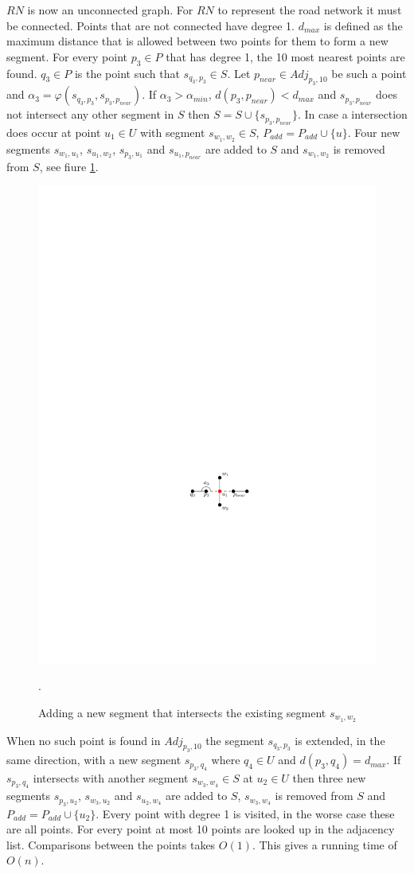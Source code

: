 \documentclass[11pt]{article}
\begin{document}
$RN$ is now an unconnected graph. For $RN$ to represent the road network it must be connected. Points that are not connected have degree 1. $d_{max}$ is defined as the maximum distance that is allowed between two points for them to form a new segment. For every point $p_3 \in P$ that has degree 1, the 10 most nearest points are found. $q_3 \in P$ is the point such that $s_{q_3, p_3} \in S$. Let $p_{near} \in Adj_{p_3,10}$ be such a point and $\alpha_3=\varphi(s_{q_3, p_3},s_{p_3, p_{near}})$. If $\alpha_3>\alpha_{min}$, $d(p_3,p_{near})<d_{max}$ and $s_{p_3, p_{near}}$ does not intersect any other segment in $S$ then $S=S \cup \{s_{p_3, p_{near}}\}$. In case a intersection does occur at point $u_1 \in U$ with segment $s_{w_1, w_2}\in S$, $P_{add}=P_{add}\cup \{u\}$. Four new segments $s_{w_1, u_1}$, $s_{u_1, w_2}$, $s_{p_3, u_1}$ and $s_{u_1, p_{near}}$ are added to $S$ and $s_{w_1, w_2}$ is removed from $S$, see fiure \ref{addintersect}.

\begin{figure}[h]
\centering
      \graphicspath{ {images/}}
      \includegraphics[width=0.5\linewidth]{NetworkAddIntersection}
      \caption{Adding a new segment that intersects the existing segment $s_{w_1,w_2}$}.
      \label{addintersect}
  \end{figure}

When no such point is found in $Adj_{p_3,10}$ the segment $s_{q_3, p_3}$ is extended, in the same direction, with a new segment $s_{p_3,q_4}$ where $q_4 \in U$ and $d(p_3,q_4)=d_{max}$. If $s_{p_3,q_4}$ intersects with another segment $s_{w_3,w_4} \in S$ at $u_2 \in U$ then three new segments $s_{p_3,u_2}$, $s_{w_3,u_2}$ and $s_{u_2,w_4}$ are added to $S$, $s_{w_3,w_4}$ is removed from $S$ and $P_{add}=P_{add}\cup \{u_2\}$. Every point with degree 1 is visited, in the worse case these are all points. For every point at most 10 points are looked up in the adjacency list. Comparisons between the points takes $O(1)$. This gives a running time of $O(n)$.
\end{document}
